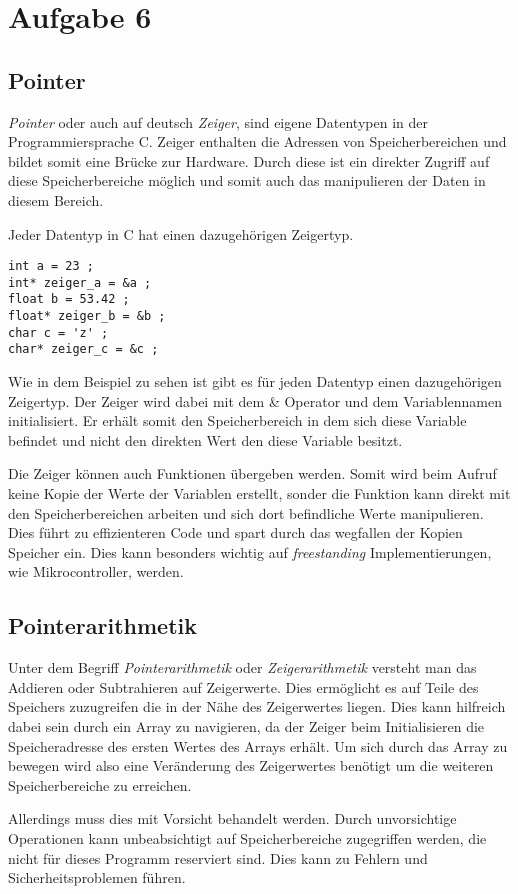 \chapter{Aufgabe 6}
\section{Pointer}
\textit{Pointer} oder auch auf deutsch \textit{Zeiger}, sind eigene Datentypen in der Programmiersprache C.
Zeiger enthalten die Adressen von Speicherbereichen und bildet somit eine Brücke zur Hardware.
Durch diese ist ein direkter Zugriff auf diese Speicherbereiche möglich und somit auch das manipulieren der Daten in diesem Bereich.\par
Jeder Datentyp in C hat einen dazugehörigen Zeigertyp\cite{bökelmann:2023}.\par

\begin{lstlisting}
int a = 23 ;
int* zeiger_a = &a ;
float b = 53.42 ;
float* zeiger_b = &b ;
char c = 'z' ;
char* zeiger_c = &c ;
\end{lstlisting}

Wie in dem Beispiel zu sehen ist gibt es für jeden Datentyp einen dazugehörigen Zeigertyp.
Der Zeiger wird dabei mit dem & Operator und dem Variablennamen initialisiert.
Er erhält somit den Speicherbereich in dem sich diese Variable befindet und nicht den direkten Wert den diese Variable besitzt.\par
Die Zeiger können auch Funktionen übergeben werden.
Somit wird beim Aufruf keine Kopie der Werte der Variablen erstellt, sonder die Funktion kann direkt mit den Speicherbereichen arbeiten und sich dort befindliche Werte manipulieren.
Dies führt zu effizienteren Code und spart durch das wegfallen der Kopien Speicher ein.
Dies kann besonders wichtig auf \textit{freestanding} Implementierungen, wie Mikrocontroller, werden.\cite{bökelmann:2023}\par

\section{Pointerarithmetik}
Unter dem Begriff \textit{Pointerarithmetik} oder \textit{Zeigerarithmetik} versteht man das Addieren oder Subtrahieren auf Zeigerwerte.
Dies ermöglicht es auf Teile des Speichers zuzugreifen die in der Nähe des Zeigerwertes liegen.
Dies kann hilfreich dabei sein durch ein Array zu navigieren, da der Zeiger beim Initialisieren die Speicheradresse des ersten Wertes des Arrays erhält.
Um sich durch das Array zu bewegen wird also eine Veränderung des Zeigerwertes benötigt um die weiteren Speicherbereiche zu erreichen.\par
Allerdings muss dies mit Vorsicht behandelt werden.
Durch unvorsichtige Operationen kann unbeabsichtigt auf Speicherbereiche zugegriffen werden, die nicht für dieses Programm reserviert sind.
Dies kann zu Fehlern und Sicherheitsproblemen führen\cite{bökelmann:2023}.\par

